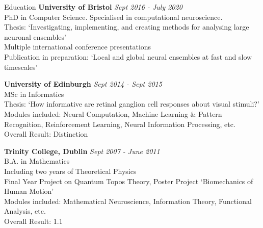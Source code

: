 \documentclass{resume} %
\begin{document}

\begin{rSection}{Education}
{\bf University of Bristol} \hfill {\em Sept 2016 - July 2020} \\
PhD in Computer Science. Specialised in computational neuroscience. \\
Thesis: `Investigating, implementing, and creating methods for analysing large neuronal ensembles' \\
Multiple international conference presentations \\
Publication in preparation: `Local and global neural ensembles at fast and slow timescales'

{\bf University of Edinburgh} \hfill {\em Sept 2014 - Sept 2015} \\
MSc in Informatics \\
Thesis: `How informative are retinal ganglion cell responses about visual stimuli?' \\
Modules included: Neural Computation, Machine Learning \& Pattern Recognition, Reinforcement Learning, Neural Information Processing, etc.  \smallskip \\
Overall Result: Distinction

{\bf Trinity College, Dublin} \hfill {\em Sept 2007 - June 2011} \\
B.A. in Mathematics \\
Including two years of Theoretical Physics \\
Final Year Project on Quantum Topos Theory, Poster Project `Biomechanics of Human Motion' \\
Modules included: Mathematical Neuroscience, Information Theory, Functional Analysis, etc. \smallskip \\
Overall Result: 1.1

\end{rSection}

\end{document}
